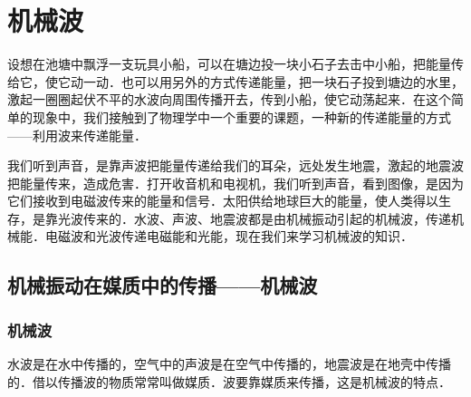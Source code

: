 \newpage
\section{机械波}
设想在池塘中飘浮一支玩具小船，可以在塘边投一块小石子去击中小船，把能量传给它，使它动一动．也可以用另外的方式传递能量，把一块石子投到塘边的水里，激起一圈圈起伏不平的水波向周围传播开去，传到小船，使它动荡起来．在这个简单的现象中，我们接触到了物理学中一个重要的课题，一种新的传递能量的方式——利用波来传递能量．

我们听到声音，是靠声波把能量传递给我们的耳朵，远处发生地震，激起的地震波把能量传来，造成危害．打开收音机和电视机，我们听到声音，看到图像，是因为它们接收到电磁波传来的能量和信号．太阳供给地球巨大的能量，使人类得以生存，是靠光波传来的．水波、声波、地震波都是由机械振动引起的机械波，传递机械能．电磁波和光波传递电磁能和光能，现在我们来学习机械波的知识．


\subsection{机械振动在媒质中的传播——机械波}
\subsubsection{机械波}

水波是在水中传播的，空气中的声波是在空气中传播的，地震波是在地壳中传播的．借以传播波的物质常常叫做媒质．波要靠媒质来传播，这是机械波的特点．



